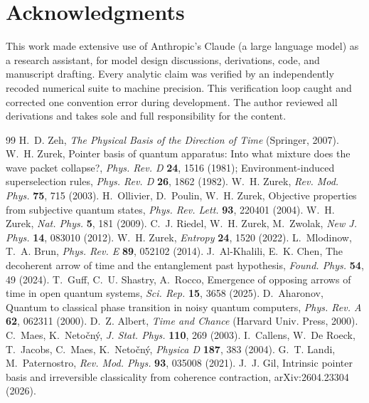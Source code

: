 \documentclass[11pt]{article}
\begin{document}
\section*{Acknowledgments}
This work made extensive use of Anthropic's Claude (a large language model) as a research assistant, for model design discussions, derivations, code, and manuscript drafting. Every analytic claim was verified by an independently recoded numerical suite to machine precision. This verification loop caught and corrected one convention error during development. The author reviewed all derivations and takes sole and full responsibility for the content.

\begin{thebibliography}{99}\small
{} H.~D. Zeh, \emph{The Physical Basis of the Direction of Time} (Springer, 2007).
 W.~H. Zurek, Pointer basis of quantum apparatus: Into what mixture does the wave packet collapse?, \emph{Phys. Rev. D} \textbf{24}, 1516 (1981); Environment-induced superselection rules, \emph{Phys. Rev. D} \textbf{26}, 1862 (1982).
 W.~H. Zurek, \emph{Rev. Mod. Phys.} \textbf{75}, 715 (2003).
 H.~Ollivier, D.~Poulin, W.~H. Zurek, Objective properties from subjective quantum states, \emph{Phys. Rev. Lett.} \textbf{93}, 220401 (2004).
 W.~H. Zurek, \emph{Nat. Phys.} \textbf{5}, 181 (2009).
 C.~J. Riedel, W.~H. Zurek, M.~Zwolak, \emph{New J. Phys.} \textbf{14}, 083010 (2012).
 W.~H. Zurek, \emph{Entropy} \textbf{24}, 1520 (2022).
 L.~Mlodinow, T.~A. Brun, \emph{Phys. Rev. E} \textbf{89}, 052102 (2014).
 J.~Al-Khalili, E.~K. Chen, The decoherent arrow of time and the entanglement past hypothesis, \emph{Found. Phys.} \textbf{54}, 49 (2024).
 T.~Guff, C.~U. Shastry, A.~Rocco, Emergence of opposing arrows of time in open quantum systems, \emph{Sci. Rep.} \textbf{15}, 3658 (2025).
 D.~Aharonov, Quantum to classical phase transition in noisy quantum computers, \emph{Phys. Rev. A} \textbf{62}, 062311 (2000).
 D.~Z. Albert, \emph{Time and Chance} (Harvard Univ. Press, 2000).
 C.~Maes, K.~Neto\v{c}n\'y, \emph{J. Stat. Phys.} \textbf{110}, 269 (2003).
 I.~Callens, W.~De Roeck, T.~Jacobs, C.~Maes, K.~Neto\v{c}n\'y, \emph{Physica D} \textbf{187}, 383 (2004).
 G.~T. Landi, M.~Paternostro, \emph{Rev. Mod. Phys.} \textbf{93}, 035008 (2021).
 J.~J. Gil, Intrinsic pointer basis and irreversible classicality from coherence contraction, arXiv:2604.23304 (2026).

\end{thebibliography}
\end{document}
